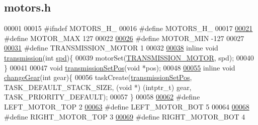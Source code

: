 \hypertarget{motors_8h_source}{}\subsection{motors.\+h}
\label{motors_8h_source}

\begin{DoxyCode}
00001 
00015 \textcolor{preprocessor}{#ifndef MOTORS\_H\_}
00016 \textcolor{preprocessor}{#define MOTORS\_H\_}
00017 
\hypertarget{motors_8h_source.tex_l00021}{}\hyperlink{motors_8h_a5cf14eeff6ae0a3163b61e2abcf1c6c0}{00021} \textcolor{preprocessor}{#define MOTOR\_MAX 127}
00022 
\hypertarget{motors_8h_source.tex_l00026}{}\hyperlink{motors_8h_a83ffb7cf4f639255103d5426aa0f8ac4}{00026} \textcolor{preprocessor}{#define MOTOR\_MIN -127}
00027 
\hypertarget{motors_8h_source.tex_l00031}{}\hyperlink{motors_8h_a7d8ac8902b66bb442bb27f9899aef13e}{00031} \textcolor{preprocessor}{#define TRANSMISSION\_MOTOR 1}
00032 
\hypertarget{motors_8h_source.tex_l00038}{}\hyperlink{motors_8h_aa1bbe2034fc14b835dd3d8c82f61135a}{00038} \textcolor{keyword}{inline} \textcolor{keywordtype}{void} \hyperlink{motors_8h_aa1bbe2034fc14b835dd3d8c82f61135a}{transmission}(\textcolor{keywordtype}{int} \hyperlink{opcontrol_8c_a642ce334330c8b0f6e33dd0a3fa65111}{spd})\{
00039     motorSet(\hyperlink{motors_8h_a7d8ac8902b66bb442bb27f9899aef13e}{TRANSMISSION\_MOTOR}, spd);
00040 \}
00041 
00047 \textcolor{keywordtype}{void} \hyperlink{motors_8h_aaab2334001d6f124f67862140b6872a0}{transmissionSetPos}(\textcolor{keywordtype}{void} *pos);
00048 
\hypertarget{motors_8h_source.tex_l00055}{}\hyperlink{motors_8h_a997340e460b7870c53c9a119c017b0cc}{00055} \textcolor{keyword}{inline} \textcolor{keywordtype}{void} \hyperlink{motors_8h_a997340e460b7870c53c9a119c017b0cc}{changeGear}(\textcolor{keywordtype}{int} gear)\{
00056     taskCreate(\hyperlink{motors_8h_aaab2334001d6f124f67862140b6872a0}{transmissionSetPos}, TASK\_DEFAULT\_STACK\_SIZE, (\textcolor{keywordtype}{void} *) (intptr\_t) gear, 
      TASK\_PRIORITY\_DEFAULT);
00057 \}
00058 
\hypertarget{motors_8h_source.tex_l00062}{}\hyperlink{motors_8h_a3e06fbce97caed16e0a0f27f544587af}{00062} \textcolor{preprocessor}{#define LEFT\_MOTOR\_TOP 2}
\hypertarget{motors_8h_source.tex_l00063}{}\hyperlink{motors_8h_a43691a92e03fa5319b14f01193f47b9a}{00063} \textcolor{preprocessor}{#define LEFT\_MOTOR\_BOT 5}
00064 
\hypertarget{motors_8h_source.tex_l00068}{}\hyperlink{motors_8h_a306c5923dd0328c4bfc09255de9d124c}{00068} \textcolor{preprocessor}{#define RIGHT\_MOTOR\_TOP 3}
\hypertarget{motors_8h_source.tex_l00069}{}\hyperlink{motors_8h_a85c904d091f71ba7fc53a446524b6c61}{00069} \textcolor{preprocessor}{#define RIGHT\_MOTOR\_BOT 4}

\end{DoxyCode}
